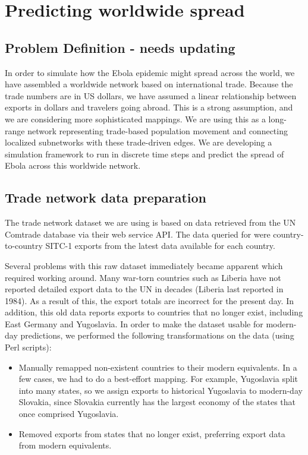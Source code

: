 \documentclass[10pt, journal,onecolumn]{IEEEtran}
\begin{document}
\section{Predicting worldwide spread}
\label{sec:Worldwide}

\subsection{{Problem Definition} - needs updating}
In order to simulate how the Ebola epidemic might spread across the world, we have assembled a
worldwide network based on international trade. Because the trade numbers are in US dollars,
we have assumed a linear relationship between exports in dollars and travelers going abroad.
This is a strong assumption, and we are considering more sophisticated mappings.
We are using this as a long-range network representing trade-based population movement and
connecting localized subnetworks with these trade-driven edges. We are developing a simulation
framework to run in discrete time steps and predict the spread of Ebola across this worldwide network.

\subsection{{Trade network data preparation}}
\label{SubSec:TradeData}

The trade network dataset we are using is based on data retrieved from the
UN Comtrade database \citep{uncomtradedata} via their web service API.
The data queried for were country-to-country SITC-1 exports from the latest data available
for each country.

Several problems with this raw dataset immediately became apparent which required working around.
Many war-torn countries such as Liberia have not reported detailed export data
to the UN in decades (Liberia last reported in 1984). As a result of this, the export totals
are incorrect for the present day. In addition, this old data reports exports to countries that
no longer exist, including East Germany and Yugoslavia. In order to make the dataset usable for
modern-day predictions, we performed the following transformations on the data (using Perl scripts):

\begin{itemize}
\item Manually remapped non-existent countries to their modern equivalents.
      In a few cases, we had to do a best-effort mapping. For example, Yugoslavia split into many
      states, so we assign exports to historical Yugoslavia to modern-day Slovakia,
      since Slovakia currently has the largest economy of the states that once comprised Yugoslavia.
\item Removed exports from states that no longer exist, preferring export data from
      modern equivalents.
\end{itemize}
\end{document}
